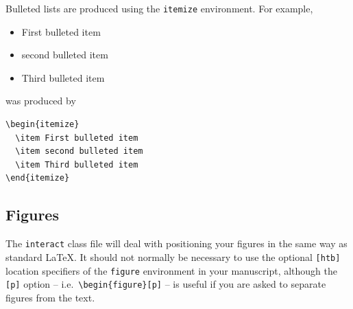 \documentclass[]{interact}
\theoremstyle{plain}%
\theoremstyle{definition}
\theoremstyle{remark}
\begin{document}
Bulleted lists are produced using the \texttt{itemize} environment. For example,
\begin{itemize}
  \item First bulleted item
  \item second bulleted item
  \item Third bulleted item
\end{itemize}
was produced by
\begin{verbatim}
\begin{itemize}
  \item First bulleted item
  \item second bulleted item
  \item Third bulleted item
\end{itemize}
\end{verbatim}


\subsection{Figures}

The \texttt{interact} class file will deal with positioning your figures in the same way as standard \LaTeX. It should not normally be necessary to use the optional \texttt{[htb]} location specifiers of the \texttt{figure} environment in your manuscript, although the \texttt{[p]} option -- i.e.\ \verb"\begin{figure}[p]" -- is useful if you are asked to separate figures from the text.
\end{document}
